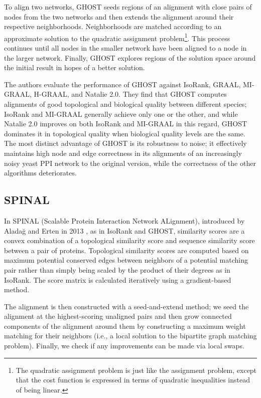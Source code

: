 \documentclass[12pt]{thesis}
\theoremstyle{plain}
\theoremstyle{definition}
\theoremstyle{remark}
\begin{document}
To align two networks, GHOST seeds regions of an alignment with close pairs of nodes from the two networks and then extends the alignment around their respective neighborhoods. Neighborhoods are matched according to an approximate solution to the quadratic assignment problem\footnote{The quadratic assignment problem is just like the assignment problem, except that the cost function is expressed in terms of quadratic inequalities instead of being linear.}. This process continues until all nodes in the smaller network have been aligned to a node in the larger network. Finally, GHOST explores regions of the solution space around the initial result in hopes of a better solution.

The authors evaluate the performance of GHOST against IsoRank, GRAAL, MI-GRAAL, H-GRAAL, and  Natalie 2.0. They find that GHOST computes alignments of good topological and biological quality between different species; IsoRank and MI-GRAAL generally achieve only one or the other, and while Natalie 2.0 improves on both IsoRank and MI-GRAAL in this regard, GHOST dominates it in topological quality when biological quality levels are the same. The most distinct advantage of GHOST is its robustness to noise; it effectively maintains high node and edge correctness in its alignments of an increasingly noisy yeast PPI network to the original version, while the correctness of the other algorithms deteriorates. 

\subsection{SPINAL}

In SPINAL (Scalable Protein Interaction Network ALignment), introduced by Alada\u{g} and Erten in 2013 \cite{aladaug2013spinal}, as in IsoRank and GHOST, similarity scores are a convex combination of a topological similarity score and sequence similarity score between a pair of proteins. Topological similarity scores are computed based on maximum potential conserved edges between neighbors of a potential matching pair rather than simply being scaled by the product of their degrees as in IsoRank. The score matrix is calculated iteratively using a gradient-based method.

The alignment is then constructed with a seed-and-extend method; we seed the alignment at the highest-scoring unaligned pairs and then grow connected components of the alignment around them by constructing a maximum weight matching for their neighbors (i.e., a local solution to the bipartite graph matching problem). Finally, we check if any improvements can be made via local swaps.
\end{document}
